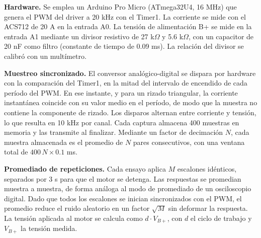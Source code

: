 \textbf{Hardware.} Se emplea un Arduino Pro Micro (ATmega32U4, 16 MHz) que genera el PWM del driver a 20 kHz con el Timer1. La corriente se mide con el ACS712 de 20 A en la entrada A0. La tensión de alimentación B+ se mide en la entrada A1 mediante un divisor resistivo de 27 k$\Omega$ y 5.6 k$\Omega$, con un capacitor de 20 nF como filtro (constante de tiempo de 0.09 ms). La relación del divisor se calibró con un multímetro.

\textbf{Muestreo sincronizado.} El conversor analógico-digital se dispara por hardware con la comparación del Timer1, en la mitad del intervalo de encendido de cada período del PWM. En ese instante, y para un rizado triangular, la corriente instantánea coincide con su valor medio en el período, de modo que la muestra no contiene la componente de rizado. Los disparos alternan entre corriente y tensión, lo que resulta en 10 kHz por canal. Cada captura almacena 400 muestras en memoria y las transmite al finalizar. Mediante un factor de decimación $N$, cada muestra almacenada es el promedio de $N$ pares consecutivos, con una ventana total de $400\,N \times 0.1$ ms.

\textbf{Promediado de repeticiones.} Cada ensayo aplica $M$ escalones idénticos, separados por 3 s para que el motor se detenga. Las respuestas se promedian muestra a muestra, de forma análoga al modo de promediado de un osciloscopio digital. Dado que todos los escalones se inician sincronizados con el PWM, el promedio reduce el ruido aleatorio en un factor $\sqrt{M}$ sin deformar la respuesta. La tensión aplicada al motor se calcula como $d \cdot V_{B+}$, con $d$ el ciclo de trabajo y $V_{B+}$ la tensión medida.

